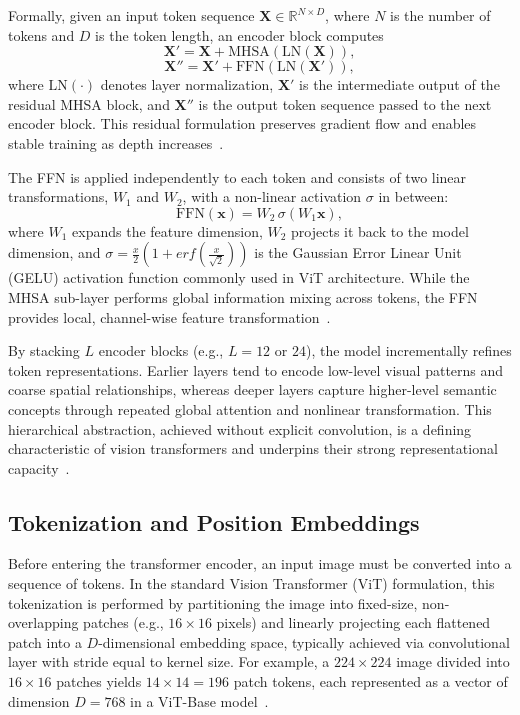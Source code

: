 \documentclass[runningheads,a4paper]{llncs}
\begin{document}
Formally, given an input token sequence $\mathbf{X} \in \mathbb{R}^{N \times D}$, where $N$ is the number of tokens and $D$ is the token length, an encoder block computes
\[
\mathbf{X}' = \mathbf{X} + \mathrm{MHSA}(\mathrm{LN}(\mathbf{X})),
\]
\[
\mathbf{X}'' = \mathbf{X}' + \mathrm{FFN}(\mathrm{LN}(\mathbf{X}')),
\]
where $\mathrm{LN}(\cdot)$ denotes layer normalization, $\mathbf{X}'$ is the intermediate output of the residual MHSA block, and $\mathbf{X}''$ is the output token sequence passed to the next encoder block. This residual formulation preserves gradient flow and enables stable training as depth increases~\cite{he2016resnet}.

The FFN is applied independently to each token and consists of two linear transformations, $W_1$ and $W_2$, with a non-linear activation $\sigma$ in between:
\[
\mathrm{FFN}(\mathbf{x}) = W_2 \, \sigma(W_1 \mathbf{x}),
\]
where $W_1$ expands the feature dimension, $W_2$ projects it back to the model dimension, and $\sigma=\frac{x}{2}\left( 1 + erf\left(\frac{x}{\sqrt{2}}\right)\right)$ is the Gaussian Error Linear Unit (GELU) activation function commonly used in ViT architecture. While the MHSA sub-layer performs global information mixing across tokens, the FFN provides local, channel-wise feature transformation~\cite{vaswani2017attention}.

By stacking $L$ encoder blocks (e.g., $L=12$ or $24$), the model incrementally refines token representations. Earlier layers tend to encode low-level visual patterns and coarse spatial relationships, whereas deeper layers capture higher-level semantic concepts through repeated global attention and nonlinear transformation. This hierarchical abstraction, achieved without explicit convolution, is a defining characteristic of vision transformers and underpins their strong representational capacity~\cite{dorszewski2025concepts_vit}.

\subsection{Tokenization and Position Embeddings}
Before entering the transformer encoder, an input image must be converted into a sequence of tokens. In the standard Vision Transformer (ViT) formulation, this tokenization is performed by partitioning the image into fixed-size, non-overlapping patches (e.g., $16\times16$ pixels) and linearly projecting each flattened patch into a $D$-dimensional embedding space, typically achieved via convolutional layer with stride equal to kernel size. For example, a $224\times224$ image divided into $16\times16$ patches yields $14\times14=196$ patch tokens, each represented as a vector of dimension $D=768$ in a ViT-Base model~\cite{dosovitskiy2021vit}.
\end{document}

